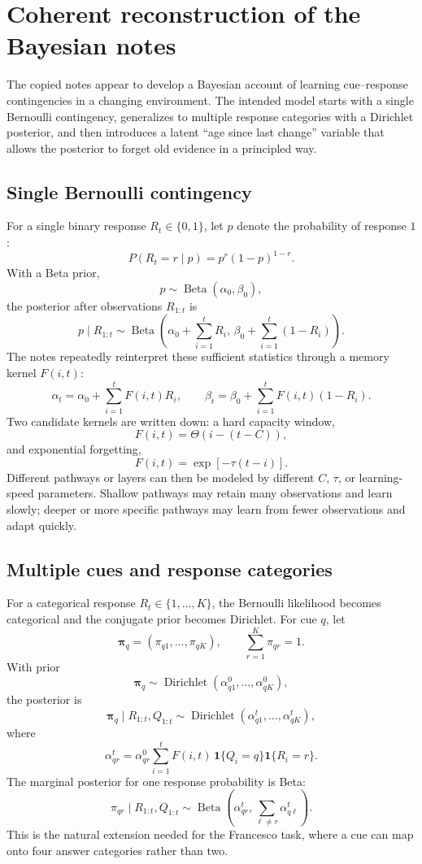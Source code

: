 
\section{Coherent reconstruction of the Bayesian notes}
\label{sec:change-point-coherent-notes}

The copied notes appear to develop a Bayesian account of learning cue--response contingencies in a changing environment. The intended model starts with a single Bernoulli contingency, generalizes to multiple response categories with a Dirichlet posterior, and then introduces a latent ``age since last change'' variable that allows the posterior to forget old evidence in a principled way.

\subsection{Single Bernoulli contingency}

For a single binary response $R_t\in\{0,1\}$, let $p$ denote the probability of response $1$:
\[
P(R_t=r\mid p)=p^r(1-p)^{1-r}.
\]
With a Beta prior,
\[
p\sim\operatorname{Beta}(\alpha_0,\beta_0),
\]
the posterior after observations $R_{1:t}$ is
\[
p\mid R_{1:t}\sim
\operatorname{Beta}\left(
\alpha_0+\sum_{i=1}^{t}R_i,\,
\beta_0+\sum_{i=1}^{t}(1-R_i)
\right).
\]
The notes repeatedly reinterpret these sufficient statistics through a memory kernel $F(i,t)$:
\[
\alpha_t=\alpha_0+\sum_{i=1}^{t}F(i,t)R_i,\qquad
\beta_t=\beta_0+\sum_{i=1}^{t}F(i,t)(1-R_i).
\]
Two candidate kernels are written down: a hard capacity window,
\[
F(i,t)=\Theta(i-(t-C)),
\]
and exponential forgetting,
\[
F(i,t)=\exp[-\tau(t-i)].
\]
Different pathways or layers can then be modeled by different $C$, $\tau$, or learning-speed parameters. Shallow pathways may retain many observations and learn slowly; deeper or more specific pathways may learn from fewer observations and adapt quickly.

\subsection{Multiple cues and response categories}

For a categorical response $R_t\in\{1,\ldots,K\}$, the Bernoulli likelihood becomes categorical and the conjugate prior becomes Dirichlet. For cue $q$, let
\[
\boldsymbol{\pi}_q=(\pi_{q1},\ldots,\pi_{qK}),\qquad
\sum_{r=1}^{K}\pi_{qr}=1.
\]
With prior
\[
\boldsymbol{\pi}_q\sim\operatorname{Dirichlet}(\alpha_{q1}^{0},\ldots,\alpha_{qK}^{0}),
\]
the posterior is
\[
\boldsymbol{\pi}_q\mid R_{1:t},Q_{1:t}
\sim
\operatorname{Dirichlet}(\alpha_{q1}^{t},\ldots,\alpha_{qK}^{t}),
\]
where
\[
\alpha_{qr}^{t}
=\alpha_{qr}^{0}
\sum_{i=1}^{t}F(i,t)\,\mathbf{1}\{Q_i=q\}\mathbf{1}\{R_i=r\}.
\]
The marginal posterior for one response probability is Beta:
\[
\pi_{qr}\mid R_{1:t},Q_{1:t}
\sim
\operatorname{Beta}\left(\alpha_{qr}^{t},\sum_{\ell\neq r}\alpha_{q\ell}^{t}\right).
\]
This is the natural extension needed for the Francesco task, where a cue can map onto four answer categories rather than two.

